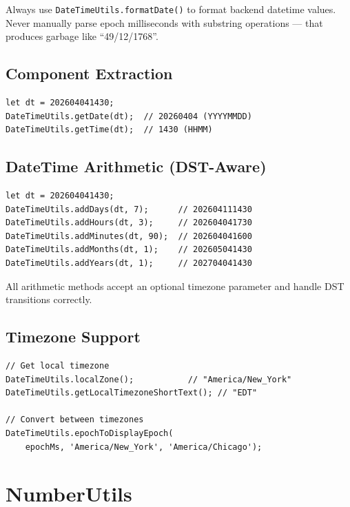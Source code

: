 \begin{warnbox}
Always use \texttt{DateTimeUtils.formatDate()} to format backend datetime values.  Never manually parse epoch milliseconds with substring operations --- that produces garbage like ``49/12/1768''.
\end{warnbox}

\subsection{Component Extraction}

\begin{lstlisting}[style=javascript]
let dt = 202604041430;
DateTimeUtils.getDate(dt);  // 20260404 (YYYYMMDD)
DateTimeUtils.getTime(dt);  // 1430 (HHMM)
\end{lstlisting}

\subsection{DateTime Arithmetic (DST-Aware)}

\begin{lstlisting}[style=javascript]
let dt = 202604041430;
DateTimeUtils.addDays(dt, 7);      // 202604111430
DateTimeUtils.addHours(dt, 3);     // 202604041730
DateTimeUtils.addMinutes(dt, 90);  // 202604041600
DateTimeUtils.addMonths(dt, 1);    // 202605041430
DateTimeUtils.addYears(dt, 1);     // 202704041430
\end{lstlisting}

\noindent
All arithmetic methods accept an optional timezone parameter and handle DST transitions correctly.

\subsection{Timezone Support}

\begin{lstlisting}[style=javascript]
// Get local timezone
DateTimeUtils.localZone();           // "America/New_York"
DateTimeUtils.getLocalTimezoneShortText(); // "EDT"

// Convert between timezones
DateTimeUtils.epochToDisplayEpoch(
    epochMs, 'America/New_York', 'America/Chicago');
\end{lstlisting}

\section{NumberUtils}
\label{sec:feu-numberutils}

